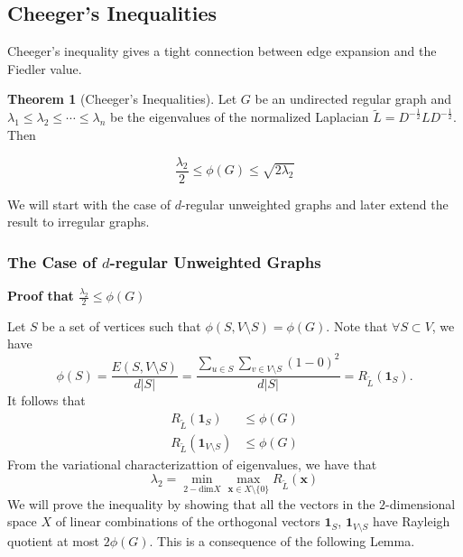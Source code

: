 \documentclass[a4paper]{article}
\theoremstyle{definition}
\newtheorem{theorem}{Theorem}[section]
\begin{document}
\subsection{Cheeger's Inequalities}

Cheeger's inequality gives a tight connection between edge expansion and the Fiedler value. 

\begin{theorem}[Cheeger’s Inequalities] Let $G$ be an undirected regular graph and $\lambda_1\leq \lambda_2\leq\cdots\leq\lambda_n$ be the eigenvalues of the normalized Laplacian $\tilde{L}=D^{-\frac{1}{2}}LD^{-\frac{1}{2}}$. Then

\begin{equation}
    \frac{\lambda_2}{2}\leq \phi(G)\leq \sqrt{2\lambda_2}
\end{equation}

% 
%

\end{theorem}

We will start with the case of $d$-regular unweighted graphs and later extend the result to irregular graphs.

\subsubsection{The Case of $d$-regular Unweighted Graphs}

\textbf{Proof that $\frac{\lambda_2}{2}\leq \phi(G)$}

Let $S$ be a set of vertices such that $\phi(S, V\setminus S)=\phi(G)$. Note that $\forall S\subset V$, we have
\begin{equation}
    \phi(S)=\frac{E(S, V\setminus S)}{d|S|} = \frac{\sum_{u\in S}\sum_{v\in V\setminus S}(1-0)^2}{d|S|} = R_{\tilde{L}}(\textbf{1}_{S}).
\end{equation}
It follows that
\begin{align}
    R_{\tilde{L}}(\textbf{1}_{S}) &\leq \phi(G)\\
    R_{\tilde{L}}(\textbf{1}_{V\setminus S}) &\leq \phi(G)
\end{align}
From the variational characterizattion of eigenvalues, we have that
\begin{equation}
    \lambda_2=\min_{2-\text{dim} X}\max_{\textbf{x}\in X\setminus\{0\}}R_{\tilde{L}}(\textbf{x})
\end{equation}
We will prove the inequality by showing that all the vectors in the $2$-dimensional space $X$ of linear combinations of the orthogonal vectors $\textbf{1}_{S}$, $\textbf{1}_{V\setminus S}$ have Rayleigh quotient at most $2\phi(G)$. This is a consequence of the following Lemma.
\end{document}
